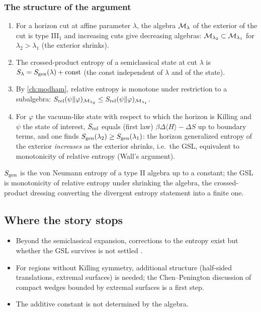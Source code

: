 \subsubsection*{The structure of the argument}
\begin{enumerate}
\item For a horizon cut at affine parameter $\lambda$, the algebra $\mathcal{M}_\lambda$ of the exterior of the cut is type III$_1$ and increasing cuts give decreasing algebras: $\mathcal{M}_{\lambda_2}\subset\mathcal{M}_{\lambda_1}$ for $\lambda_2>\lambda_1$ (the exterior shrinks).
\item The crossed-product entropy of a semiclassical state at cut $\lambda$ is $S_\lambda=S_{\mathrm{gen}}(\lambda)+\text{const}$ (the const independent of $\lambda$ and of the state).
\item By \cref{ch:modham}, relative entropy is monotone under restriction to a subalgebra: $S_{\rm rel}(\psi\|\varphi)_{\mathcal{M}_{\lambda_2}}\le S_{\rm rel}(\psi\|\varphi)_{\mathcal{M}_{\lambda_1}}$.
\item For $\varphi$ the vacuum-like state with respect to which the horizon is Killing and $\psi$ the state of interest, $S_{\rm rel}$ equals (first law) $\beta\Delta\langle H\rangle-\Delta S$ up to boundary terms, and one finds $S_{\mathrm{gen}}(\lambda_2)\ge S_{\mathrm{gen}}(\lambda_1)$: the horizon generalized entropy of the exterior \emph{increases} as the exterior shrinks, i.e.\ the GSL, equivalent to monotonicity of relative entropy (Wall's argument).
\end{enumerate}

\begin{keyidea}
$S_{\mathrm{gen}}$ is the von Neumann entropy of a type II algebra up to a constant; the GSL is monotonicity of relative entropy under shrinking the algebra, the crossed-product dressing converting the divergent entropy statement into a finite one.
\end{keyidea}

\subsection{Where the story stops}

\begin{itemize}
\item Beyond the semiclassical expansion, corrections to the entropy exist but whether the GSL survives is not settled \cite{FaulknerSperanza2024}.
\item For regions without Killing symmetry, additional structure (half-sided translations, extremal surfaces) is needed; the Chen--Penington discussion of compact wedges bounded by extremal surfaces is a first step.
\item The additive constant is not determined by the algebra.
\end{itemize}

